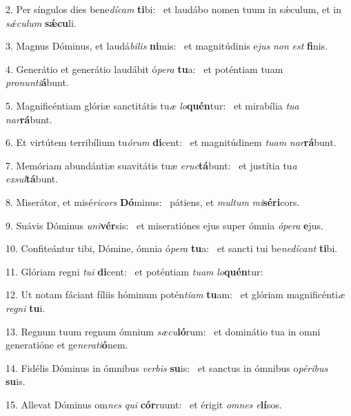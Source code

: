 2. Per síngulos dies bene\textit{dí}\textit{cam} \textbf{ti}bi: \ast\  et laudábo nomen tuum in sǽculum, et in \textit{sǽ}\textit{cu}\textit{lum} \textbf{sǽ}\textbf{cu}li.\

3. Magnus Dóminus, et laudá\textit{bi}\textit{lis} \textbf{ni}mis: \ast\  et magnitúdinis e\textit{jus} \textit{non} \textit{est} \textbf{fi}nis.\

4. Generátio et generátio laudábit ó\textit{pe}\textit{ra} \textbf{tu}a: \ast\  et poténtiam tuam \textit{pro}\textit{nun}\textit{ti}\textbf{á}bunt.\

5. Magnificéntiam glóriæ sanctitátis tu\textit{æ} \textit{lo}\textbf{quén}tur: \ast\  et mirabília \textit{tu}\textit{a} \textit{nar}\textbf{rá}bunt.\

6. Et virtútem terribílium tu\textit{ó}\textit{rum} \textbf{di}cent: \ast\  et magnitúdinem \textit{tu}\textit{am} \textit{nar}\textbf{rá}bunt.\

7. Memóriam abundántiæ suavitátis tuæ \textit{e}\textit{ruc}\textbf{tá}bunt: \ast\  et justítia tu\textit{a} \textit{ex}\textit{sul}\textbf{tá}bunt.\

8. Miserátor, et misé\textit{ri}\textit{cors} \textbf{Dó}minus: \ast\  pátiens, et \textit{mul}\textit{tum} \textit{mi}\textbf{sé}\textbf{ri}cors.\

9. Suávis Dóminus \textit{u}\textit{ni}\textbf{vér}sis: \ast\  et miseratiónes ejus super ómnia \textit{ó}\textit{pe}\textit{ra} \textbf{e}jus.\

10. Confiteántur tibi, Dómine, ómnia ó\textit{pe}\textit{ra} \textbf{tu}a: \ast\  et sancti tui be\textit{ne}\textit{dí}\textit{cant} \textbf{ti}bi.\

11. Glóriam regni \textit{tu}\textit{i} \textbf{di}cent: \ast\  et poténtiam \textit{tu}\textit{am} \textit{lo}\textbf{quén}tur:\

12. Ut notam fáciant fíliis hóminum potén\textit{ti}\textit{am} \textbf{tu}am: \ast\  et glóriam magnificénti\textit{æ} \textit{re}\textit{gni} \textbf{tu}i.\

13. Regnum tuum regnum ómnium \textit{sæ}\textit{cu}\textbf{ló}rum: \ast\  et dominátio tua in omni generatióne et ge\textit{ne}\textit{ra}\textit{ti}\textbf{ó}nem.\

14. Fidélis Dóminus in ómnibus \textit{ver}\textit{bis} \textbf{su}is: \ast\  et sanctus in ómnibus o\textit{pé}\textit{ri}\textit{bus} \textbf{su}is.\

15. Allevat Dóminus om\textit{nes} \textit{qui} \textbf{cór}ruunt: \ast\  et érigit \textit{om}\textit{nes} \textit{e}\textbf{lí}sos.\

